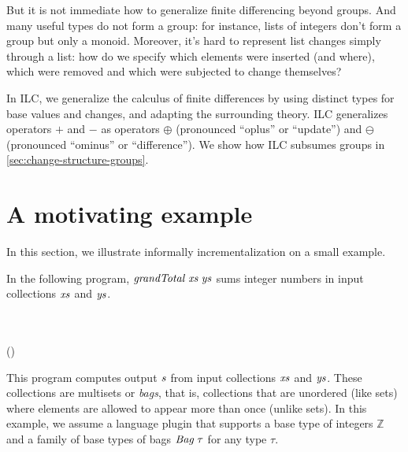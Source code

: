 But it is not immediate how to generalize finite differencing
beyond groups. And many useful types do not form a group: for
instance, lists of integers don't form a group but only a monoid.
Moreover, it's hard to represent list changes simply through a
list: how do we specify which elements were inserted (and where),
which were removed and which were subjected to change themselves?

In ILC, we generalize the calculus of finite differences by
using distinct types for base values and changes, and adapting
the surrounding theory. ILC generalizes operators \ensuremath{\mathbin{+}} and \ensuremath{\mathbin{-}} as operators
\ensuremath{\oplus } (pronounced ``oplus'' or ``update'') and \ensuremath{\ominus } (pronounced
``ominus'' or ``difference''). We show how ILC subsumes groups in
\cref{sec:change-structure-groups}.

\section{A motivating example}
\label{sec:motiv-example}
In this section, we illustrate informally incrementalization on a
small example.

In the following program, \ensuremath{\Varid{grandTotal}\;\Varid{xs}\;\Varid{ys}} sums integer numbers in
input collections \ensuremath{\Varid{xs}} and \ensuremath{\Varid{ys}}.

\begin{hscode}\SaveRestoreHook
{}%
%
%
%
\>[3]{}\<[22]%
\>[22]{}\mathrel{:\mkern-1mu:}\;\to {}\;\to {}\<[E]%
\\
\>[3]{}\<[22]%
\>[22]{}\mathrel{:\mkern-1mu:}\<[E]%
\\[\blanklineskip]%
\>[3]{}\;\;\<[22]%
\>[22]{}\mathrel{=}\;(\;\;){}\<[E]%
\\
\>[3]{}\<[22]%
\>[22]{}\mathrel{=}\;\;\<[E]%
\ColumnHook
\end{hscode}\resethooks

This program computes output \ensuremath{\Varid{s}} from input collections \ensuremath{\Varid{xs}} and
\ensuremath{\Varid{ys}}. These collections are multisets or \emph{bags}, that is,
collections that are unordered (like sets) where elements are
allowed to appear more than once (unlike sets). In this example,
we assume a language plugin that supports a base type of integers
\ensuremath{\mathbb{Z}} and a family of base types of bags \ensuremath{\Conid{Bag}\;\tau} for any type
\ensuremath{\tau}.

